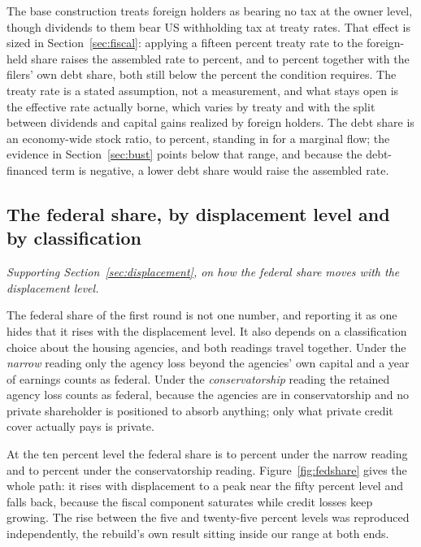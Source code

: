 The base construction treats foreign holders as bearing no tax at the owner level, though
dividends to them bear US withholding tax at treaty rates. That effect is sized in
Section~\ref{sec:fiscal}: applying a fifteen percent treaty rate to the foreign-held share raises
the assembled rate to  percent, and to  percent
together with the filers' own debt share, both still below the  percent
the condition requires. The treaty rate is a stated assumption, not a measurement, and what stays
open is the effective rate actually borne, which varies by treaty and with the split between
dividends and capital gains realized by foreign holders. The debt share is an economy-wide stock ratio,  to
 percent, standing in for a marginal flow; the evidence in
Section~\ref{sec:bust} points below that range, and because the debt-financed term is negative, a
lower debt share would raise the assembled rate.

\subsection{The federal share, by displacement level and by classification}

\emph{Supporting Section~\ref{sec:displacement}, on how the federal share moves with the displacement level.}

The federal share of the first round is not one number, and reporting it as one hides that it
rises with the displacement level. It also depends on a classification choice about the housing
agencies, and both readings travel together. Under the \emph{narrow} reading only the agency loss
beyond the agencies' own capital and a year of earnings counts as federal. Under the
\emph{conservatorship} reading the retained agency loss counts as federal, because the agencies
are in conservatorship and no private shareholder is positioned to absorb anything; only what
private credit cover actually pays is private.

At the ten percent level the federal share is  to
 percent under the narrow reading and  to
 percent under the conservatorship reading.
Figure~\ref{fig:fedshare} gives the whole path: it rises with displacement to a peak near the
fifty percent level and falls back, because the fiscal component saturates while credit losses
keep growing. The rise between the five and twenty-five percent levels was reproduced
independently, the rebuild's own result sitting inside our range at both ends.

